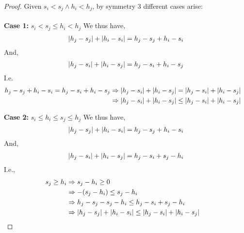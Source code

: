 \documentclass[12pt]{article}
\newenvironment{question}[2][Question]{\begin{trivlist}
\item[\hskip \labelsep {\bfseries #1}\hskip \labelsep {\bfseries #2.}]}{\end{trivlist}}
\DeclarePairedDelimiter\abs{\lvert}{\rvert}%
\begin{document}
\begin{question}{2 (a)}
  \begin{proof}
    Given $s_{i} < s_{j} \land h_{i} < h_{j}$, by symmetry 3 different cases arise: \\ \\
    \textbf{Case 1:} $s_{i} < s_{j} \leq h_{i} < h_{j}$
    We thus have,
    \begin{align*}
      \abs{h_{j} - s_{j}} + \abs{h_{i} - s_{i}} = h_{j} - s_{j} + h_{i} - s_{i}
    \end{align*}
    And,
    \begin{align*}
      \abs{h_{j} - s_{i}} + \abs{h_{i} - s_{j}} = h_{j} - s_{i} + h_{i} - s_{j}
    \end{align*}
    I.e.
    \begin{align*}
      h_{j} - s_{j} + h_{i} - s_{i} = h_{j} - s_{i} + h_{i} - s_{j} & \Rightarrow \abs{h_{j} - s_{i}} + \abs{h_{i} - s_{j}} = \abs{h_{j} - s_{i}} + \abs{h_{i} - s_{j}} & \\
                                                                    & \Rightarrow \abs{h_{j} - s_{i}} + \abs{h_{i} - s_{j}} \leq \abs{h_{j} - s_{i}} + \abs{h_{i} - s_{j}} &
    \end{align*}

    \textbf{Case 2:} $s_{i} \leq h_{i} \leq s_{j} \leq h_{j}$
    We thus have,
    \begin{align*}
      \abs{h_{j} - s_{j}} + \abs{h_{i} - s_{i}} = h_{j} - s_{j} + h_{i} - s_{i}
    \end{align*}
    And,
    \begin{align*}
      \abs{h_{j} - s_{i}} + \abs{h_{i} - s_{j}} = h_{j} - s_{i} + s_{j} - h_{i}
    \end{align*}
    I.e.,
    \begin{align*}
      s_{j} \geq h_{i} & \Rightarrow s_{j} - h_{i} \geq 0 & \\
                       & \Rightarrow -(s_{j} - h_{i}) \leq s_{j} - h_{i} & \\
                       & \Rightarrow h_{j} - s_{j} - s_{j} - h_{i} \leq h_{j} - s_{i} + s_{j} - h_{i} &\\
                       & \Rightarrow \abs{h_{j} - s_{j}} + \abs{h_{i} - s_{i}} \leq \abs{h_{j} - s_{i}} + \abs{h_{i} - s_{j}} & \\
    \end{align*}


\end{proof}
\end{question}
\end{document}
